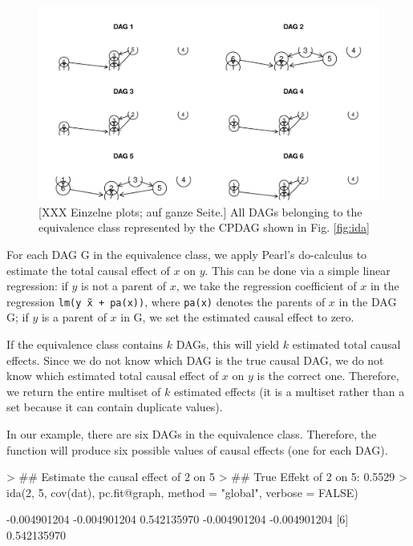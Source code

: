 \documentclass[article]{jss}
\begin{document}
\begin{figure}
  \begin{center}
\includegraphics{pcalgDoc-017}
\caption{[XXX Einzelne plots; auf ganze Seite.] All DAGs belonging to the
  equivalence class represented by the CPDAG shown in Fig. \ref{fig:ida}}
\label{fig:allDags}
\end{center}
\end{figure}

For each DAG G in the equivalence class, we apply Pearl's do-calculus to
estimate the total causal effect of $x$ on $y$. This can be done via a
simple linear regression: if $y$ is not a parent of $x$, we take the
regression coefficient of $x$ in the regression \texttt{lm(y \~ x +
  pa(x))}, where \texttt{pa(x)} denotes the parents of $x$ in the DAG G; if
$y$ is a parent of $x$ in G, we set the estimated causal effect to zero.

If the equivalence class contains $k$ DAGs, this will yield $k$ estimated
total causal effects. Since we do not know which DAG is the true causal
DAG, we do not know which estimated total causal effect of $x$ on $y$ is
the correct one. Therefore, we return the entire multiset of $k$ estimated
effects (it is a multiset rather than a set because it can contain
duplicate values).

In our example, there are six DAGs in the equivalence class. Therefore, the
function  will produce six possible values of causal effects (one
for each DAG). 

\begin{Schunk}
\begin{Sinput}
> ## Estimate the causal effect of 2 on 5
> ## True Effekt of 2 on 5: 0.5529
>      ida(2, 5, cov(dat), pc.fit@graph, method = "global", verbose = FALSE)
\end{Sinput}
\begin{Soutput}
[1] -0.004901204 -0.004901204  0.542135970 -0.004901204 -0.004901204
[6]  0.542135970
\end{Soutput}
\end{Schunk}
\end{document}

